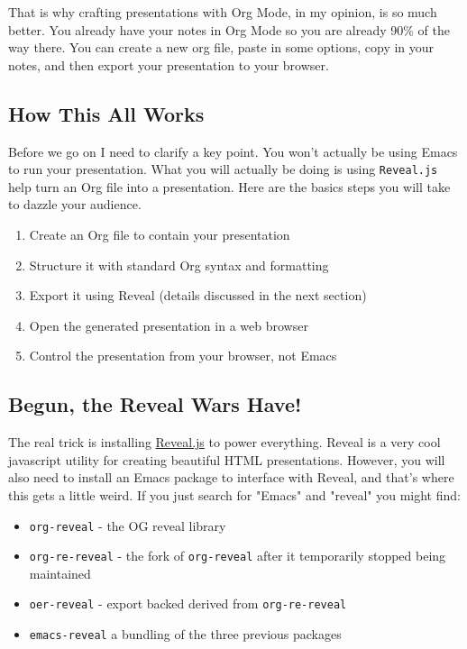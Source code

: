 \documentclass[11pt]{article}
\begin{document}
That is why crafting presentations with Org Mode, in my opinion, is so much better. You already have your notes in Org Mode so you are already 90\% of the way there. You can create a new org file, paste in some options, copy in your notes, and then export your presentation to your browser.
\subsection*{How This All Works}
\label{sec:orgef1c66a}
Before we go on I need to clarify a key point. You won't actually be using Emacs to run your presentation. What you will actually be doing is using \texttt{Reveal.js} help turn an Org file into a presentation. Here are the basics steps you will take to dazzle your audience.

\begin{enumerate}
\item Create an Org file to contain your presentation
\item Structure it with standard Org syntax and formatting
\item Export it using Reveal (details discussed in the next section)
\item Open the generated presentation in a web browser
\item Control the presentation from your browser, not Emacs
\end{enumerate}
\subsection*{Begun, the Reveal Wars Have!}
\label{sec:org84094e5}
The real trick is installing \href{https://revealjs.com/}{Reveal.js} to power everything. Reveal is a very cool javascript utility for creating beautiful HTML presentations. However, you will also need to install an Emacs package to interface with Reveal, and that's where this gets a little weird. If you just search for "Emacs" and "reveal" you might find:

\begin{itemize}
\item \texttt{org-reveal} - the OG reveal library
\item \texttt{org-re-reveal} - the fork of \texttt{org-reveal} after it temporarily stopped being maintained
\item \texttt{oer-reveal} - export backed derived from \texttt{org-re-reveal}
\item \texttt{emacs-reveal} a bundling of the three previous packages
\end{itemize}
\end{document}

